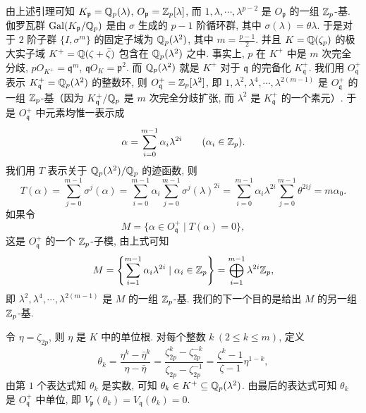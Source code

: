 由上述引理可知 $K_{\mathfrak{p}}=\mathbb{Q}_p(\lambda)$, $O_{\mathfrak{p}}=\mathbb{Z}_p[\lambda]$, 而 $1,\lambda,\cdots,\lambda^{p-2}$ 是 $O_{\mathfrak{p}}$ 的一组 $\mathbb{Z}_p$-基. 伽罗瓦群 $\operatorname{Gal}(K_{\mathfrak{p}}/\mathbb{Q}_p)$ 是由 $\sigma$ 生成的 $p-1$ 阶循环群, 其中 $\sigma(\lambda)=\theta\lambda$. 于是对于 $2$ 阶子群 $\{I,\sigma^m\}$ 的固定子域为 $\mathbb{Q}_p(\lambda^2)$, 其中 $m=\frac{p-1}{2}$. 并且 $K=\mathbb{Q}(\zeta_p)$ 的极大实子域 $K^+=\mathbb{Q}(\zeta+\bar{\zeta})$ 包含在 $\mathbb{Q}_p(\lambda^2)$ 之中. 事实上, $p$ 在 $K^+$ 中是 $m$ 次完全分歧, $pO_{K^+}=\mathfrak{q}^m$, $\mathfrak{q}O_K=\mathfrak{p}^2$. 而 $\mathbb{Q}_p(\lambda^2)$ 就是 $K^+$ 对于 $\mathfrak{q}$ 的完备化 $K_{\mathfrak{q}}^+$. 我们用 $O_{\mathfrak{q}}^+$ 表示 $K_{\mathfrak{q}}^+=\mathbb{Q}_p(\lambda^2)$ 的整数环, 则 $O_{\mathfrak{q}}^+=\mathbb{Z}_p[\lambda^2]$, 即 $1,\lambda^2,\lambda^4,\cdots,\lambda^{2(m-1)}$ 是 $O_{\mathfrak{q}}^+$ 的一组 $\mathbb{Z}_p$-基（因为 $K_{\mathfrak{q}}^+/\mathbb{Q}_p$ 是 $m$ 次完全分歧扩张, 而 $\lambda^2$ 是 $K_{\mathfrak{q}}^+$ 的一个素元）. 于是 $O_{\mathfrak{q}}^+$ 中元素均惟一表示成
\[
  \alpha=\sum_{i=0}^{m-1}\alpha_i\lambda^{2i}\qquad(\alpha_i\in\mathbb{Z}_p).
\]
我们用 $T$ 表示关于 $\mathbb{Q}_p(\lambda^2)/\mathbb{Q}_p$ 的迹函数, 则
\[
  T(\alpha)=\sum_{j=0}^{m-1}\sigma^j(\alpha)
  =\sum_{i=0}^{m-1}\alpha_i\sum_{j=0}^{m-1}\sigma^j(\lambda)^{2i}
  =\sum_{i=0}^{m-1}\alpha_i\lambda^{2i}\sum_{j=0}^{m-1}\theta^{2ij}=m\alpha_0.
\]
如果令
\[
  M=\{\alpha\in O_{\mathfrak{q}}^+\mid T(\alpha)=0\},
\]
这是 $O_{\mathfrak{q}}^+$ 的一个 $\mathbb{Z}_p$-子模, 由上式可知
\[
  M=\left\{\sum_{i=1}^{m-1}\alpha_i\lambda^{2i}\mid\alpha_i\in\mathbb{Z}_p\right\}
  =\bigoplus_{i=1}^{m-1}\lambda^{2i}\mathbb{Z}_p,
\]
即 $\lambda^2,\lambda^4,\cdots,\lambda^{2(m-1)}$ 是 $M$ 的一组 $\mathbb{Z}_p$-基. 我们的下一个目的是给出 $M$ 的另一组 $\mathbb{Z}_p$-基.

令 $\eta=\zeta_{2p}$, 则 $\eta$ 是 $K$ 中的单位根. 对每个整数 $k\ (2\leqslant k\leqslant m)$, 定义
\[
  \theta_k=\frac{\eta^k-\bar{\eta}^k}{\eta-\bar{\eta}}
  =\frac{\zeta_{2p}^k-\zeta_{2p}^{-k}}{\zeta_{2p}-\zeta_{2p}^{-1}}
  =\frac{\zeta^k-1}{\zeta-1}\eta^{1-k},
\]
由第 $1$ 个表达式知 $\theta_k$ 是实数, 可知 $\theta_k\in K^+\subseteq\mathbb{Q}_p(\lambda^2)$. 由最后的表达式可知 $\theta_k$ 是 $O_{\mathfrak{q}}^+$ 中单位, 即 $V_{\mathfrak{p}}(\theta_k)=V_{\mathfrak{q}}(\theta_k)=0$.

